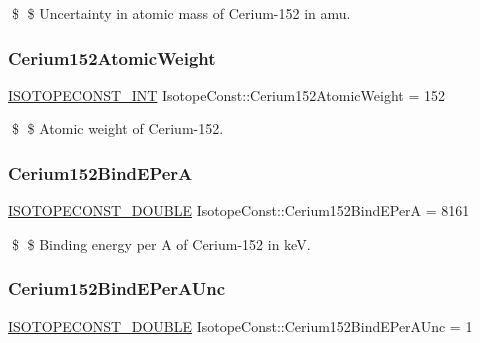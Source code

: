 \$ \$ Uncertainty in atomic mass of Cerium-\/152 in amu. \mbox{\label{group___isotope_const-_cerium-_ce152_ga17d275da03c11ea3ee2d3a334a4b6ee8}} 
\subsubsection{\texorpdfstring{Cerium152\+Atomic\+Weight}{Cerium152AtomicWeight}}
{\footnotesize\ttfamily \mbox{\hyperlink{group___isotope_const-_macros_ga5f18360b3e99483a35c32d789e62621c}{I\+S\+O\+T\+O\+P\+E\+C\+O\+N\+S\+T\+\_\+\+I\+NT}} Isotope\+Const\+::\+Cerium152\+Atomic\+Weight = 152}

\$ \$ Atomic weight of Cerium-\/152. \mbox{\label{group___isotope_const-_cerium-_ce152_ga1a786b8c427e151a3aa86f6d7a53a8a0}} 
\subsubsection{\texorpdfstring{Cerium152\+Bind\+E\+PerA}{Cerium152BindEPerA}}
{\footnotesize\ttfamily \mbox{\hyperlink{group___isotope_const-_macros_ga8f45a7272ce02c0b4c65c44636ed719a}{I\+S\+O\+T\+O\+P\+E\+C\+O\+N\+S\+T\+\_\+\+D\+O\+U\+B\+LE}} Isotope\+Const\+::\+Cerium152\+Bind\+E\+PerA = 8161}

\$ \$ Binding energy per A of Cerium-\/152 in keV. \mbox{\label{group___isotope_const-_cerium-_ce152_ga3394ef879de794731e12bc66905b7807}} 
\subsubsection{\texorpdfstring{Cerium152\+Bind\+E\+Per\+A\+Unc}{Cerium152BindEPerAUnc}}
{\footnotesize\ttfamily \mbox{\hyperlink{group___isotope_const-_macros_ga8f45a7272ce02c0b4c65c44636ed719a}{I\+S\+O\+T\+O\+P\+E\+C\+O\+N\+S\+T\+\_\+\+D\+O\+U\+B\+LE}} Isotope\+Const\+::\+Cerium152\+Bind\+E\+Per\+A\+Unc = 1}


